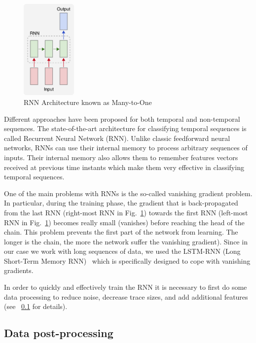\documentclass{article}
\begin{document}
\begin{figure}
    \centering
    \vspace{-8pt}
    \includegraphics[width=0.24\textwidth]{figures/rnn}
    \caption{RNN Architecture known as Many-to-One \label{fig:rnn}}
    \vspace{-12pt}
\end{figure}

Different approaches have been proposed for both temporal and non-temporal sequences.
The state-of-the-art architecture for classifying temporal sequences is called Recurrent Neural
Network (RNN). Unlike classic feedforward neural networks, RNNs can use their internal memory
to process arbitrary sequences of inputs. Their internal memory also allows them to remember
features vectors received at previous time instants which make them very effective in classifying
temporal sequences.

One of the main problems with RNNs is the so-called vanishing gradient problem. In particular,
during the training phase, the gradient that is back-propagated from the last RNN (right-most
RNN in Fig.~\ref{fig:rnn}) towards the first RNN (left-most RNN in Fig.~\ref{fig:rnn}) becomes
really small (vanishes) before reaching the head of the chain. This problem prevents the first
part of the network from learning. The longer is the chain, the more the network suffer
the vanishing gradient). Since in our case we work with long sequences of data, we used
the LSTM-RNN (Long Short-Term Memory RNN)~\cite{sundermeyer2012lstm} which is 
specifically designed to cope with vanishing gradients.

In order to quickly and effectively train the RNN it is necessary to first do some data processing
to reduce noise, decrease trace sizes, and add additional features (see ~\ref{subs:postproc} 
for details).


\subsection{Data post-processing}\label{subs:postproc}
\vspace{-.2cm}
\end{document}
